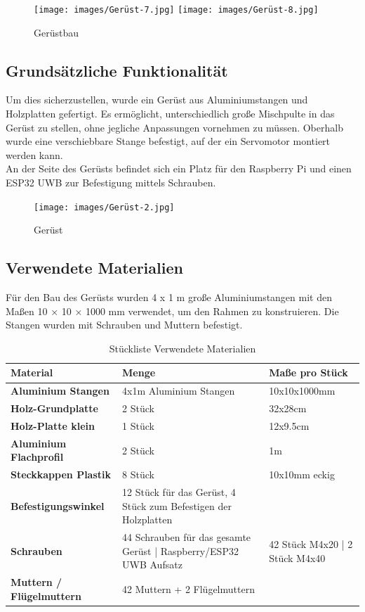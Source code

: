 \begin{figure}[H]
	\centering
	\texttt{[image: images/Gerüst-7.jpg]}
		\texttt{[image: images/Gerüst-8.jpg]}
	\caption[Gerüstbau]{Gerüstbau}
	\label{fig:Gerüstbau}
\end{figure}


\subsection{Grundsätzliche Funktionalität}
Um dies sicherzustellen, wurde ein Gerüst aus Aluminiumstangen und Holzplatten gefertigt. Es ermöglicht, unterschiedlich große Mischpulte in das Gerüst zu stellen, ohne jegliche Anpassungen vornehmen zu müssen. Oberhalb wurde eine verschiebbare Stange befestigt, auf der ein Servomotor montiert werden kann.\\
An der Seite des Gerüsts befindet sich ein Platz für den Raspberry Pi und einen ESP32 UWB zur Befestigung mittels Schrauben.

\begin{figure}[H]
	\centering
	\texttt{[image: images/Gerüst-2.jpg]}
	\caption[Gerüst]{Gerüst}
	\label{fig:Gerüst-1}
\end{figure}



\subsection{Verwendete Materialien}
Für den Bau des Gerüsts wurden 4 x 1 m große Aluminiumstangen mit den Maßen 10 × 10 × 1000 mm verwendet, um den Rahmen zu konstruieren. Die Stangen wurden mit Schrauben und Muttern befestigt.\\

\begin{table} [H]
	\begin{tabular}{ |p{3.3cm} |p{4.8cm}|p{4.8cm}| }
		\hline
		\textbf{Material} & \textbf{Menge}& \textbf{Maße pro Stück}\\
		\hline
		\textbf{Aluminium Stangen} & 4x1m Aluminium Stangen & 10x10x1000mm  \\ 
		\hline
		\textbf{Holz-Grundplatte} & 2 Stück & 32x28cm   \\  
		\hline
		\textbf{Holz-Platte klein} & 1 Stück & 12x9.5cm   \\  
		\hline
		\textbf{Aluminium Flachprofil} & 2 Stück  & 1m \\
		\hline
		\textbf{Steckkappen Plastik} & 8 Stück & 10x10mm eckig  \\
		\hline
		\textbf{Befestigungswinkel}& 12 Stück für das Gerüst, 4 Stück zum Befestigen der Holzplatten   &  \\
		\hline
		\textbf{Schrauben}& 44 Schrauben für das gesamte Gerüst | 	Raspberry/ESP32 UWB Aufsatz & 42 Stück M4x20 | 2 Stück M4x40\\
		\hline
		\textbf{Muttern / Flügelmuttern}& 42 Muttern + 2 Flügelmuttern & \\
		\hline	
	\end{tabular}
	\caption{Stückliste Verwendete Materialien} 
\end{table} 





